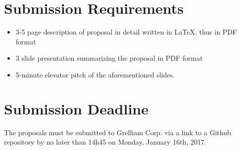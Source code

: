 \documentclass[12pt]{article}
\begin{document}
\section{Submission Requirements}
\begin{itemize}[noitemsep]
	\item 3-5 page description of proposal in detail written in \LaTeX, thus in PDF format
	\item 3 slide presentation summarizing the proposal in PDF format
	\item 5-minute elevator pitch of the aforementioned slides.
\end{itemize}
 
\section{Submission Deadline}
The proposals must be submitted to Grelliam Corp. via a link to a Github repository by no later than 14h45 on Monday,
January 16th, 2017.
\end{document}
